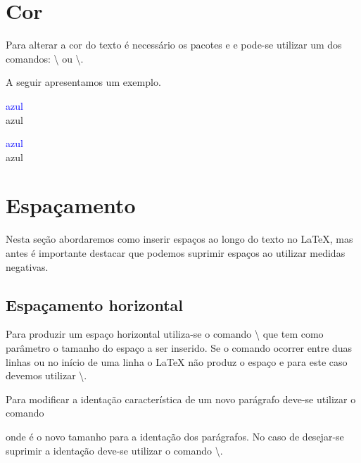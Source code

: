 \section{Cor}
Para alterar a cor do texto é necessário os pacotes  e  e pode-se utilizar um dos comandos: \textbackslash{} ou \textbackslash{}.

A seguir apresentamos um exemplo. \\
\begin{minipage}[t]{0.47\linewidth} \vspace{-8pt}
    \begin{latexcode}
        \textcolor{blue}{azul} \\
        {\color{blue}azul}
    \end{latexcode}
\end{minipage} \hfill
\begin{minipage}[t]{0.47\linewidth} \vspace{0pt}
    \textcolor{blue}{azul} \\
    {\color{blue}azul}
\end{minipage}

\section{Espaçamento}
Nesta seção abordaremos como inserir espaços ao longo do texto no LaTeX, mas antes é importante destacar que podemos suprimir espaços ao utilizar medidas negativas.

\subsection{Espaçamento horizontal}
Para produzir um espaço horizontal utiliza-se o comando \textbackslash{} que tem como parâmetro o tamanho do espaço a ser inserido. Se o comando ocorrer entre duas linhas ou no início de uma linha o LaTeX não produz o espaço e para este caso devemos utilizar  \textbackslash{}\textasteriskcentered.

Para modificar a identação característica de um novo parágrafo deve-se utilizar o comando
\begin{latexcode}
    \setlength{\parident}{tam}
\end{latexcode} 
onde  é o novo tamanho para a identação dos parágrafos. No caso de desejar-se suprimir a identação deve-se utilizar o comando \textbackslash{}.

